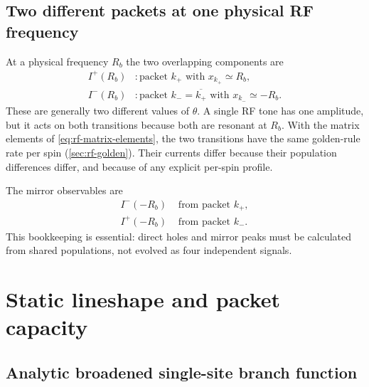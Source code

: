 \documentclass[11pt]{article}
\newcommand{\Iplus}{I^{+}}
\newcommand{\Iminus}{I^{-}}
\begin{document}
\subsection{Two different packets at one physical RF frequency}

At a physical frequency \(R_b\) the two overlapping components are
\begin{align}
  \Iplus(R_b) &: \text{packet }k_{+}\text{ with }x_{k_{+}}\simeq R_b,
  \label{eq:kplus}\\
  \Iminus(R_b) &: \text{packet }k_{-}=\overline{k_+}\text{ with }x_{k_{-}}\simeq -R_b.
  \label{eq:kminus}
\end{align}
These are generally two different values of \(\theta\). A single RF tone has one amplitude, but
it acts on both transitions because both are resonant at \(R_b\). With the matrix elements of
\cref{eq:rf-matrix-elements}, the two transitions have the same golden-rule rate per spin
(\cref{sec:rf-golden}). Their currents differ because their population differences differ, and
because of any explicit per-spin profile.

The mirror observables are
\begin{align}
  \Iminus(-R_b)&\text{ from packet }k_{+},
  \label{eq:mirrorminus}\\
  \Iplus(-R_b)&\text{ from packet }k_{-}.
  \label{eq:mirrorplus}
\end{align}
This bookkeeping is essential: direct holes and mirror peaks must be calculated from shared
populations, not evolved as four independent signals.

\section{Static lineshape and packet capacity}
\label{sec:lineshape}

\subsection{Analytic broadened single-site branch function}
\end{document}

